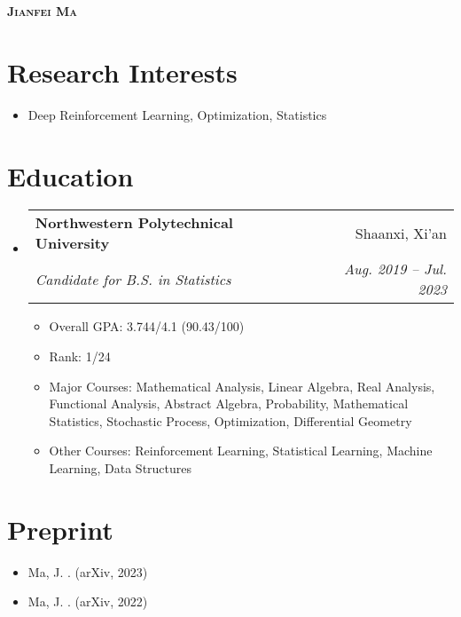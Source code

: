 \documentclass[letterpaper,11pt]{article}
\makeatletter
\newcommand{\resumeItem}[1]{
  \item\small{
    {#1 \vspace{-2pt}}
  }
}
\newcommand{\resumeSubheading}[4]{
  \vspace{-2pt}\item
    \begin{tabular*}{0.97\textwidth}[t]{l@{\extracolsep{\fill}}r}
      \textbf{#1} & #2 \\
      \textit{\small#3} & \textit{\small #4} \\
    \end{tabular*}\vspace{-7pt}
}
\newcommand{\resumeSubHeadingListStart}{\begin{itemize}[leftmargin=0.15in, label={}]}
\newcommand{\resumeSubHeadingListEnd}{\end{itemize}}
\newcommand{\resumeItemListStart}{\begin{itemize}}
\newcommand{\resumeItemListEnd}{\end{itemize}\vspace{-5pt}}
\makeatother
\begin{document}

\begin{center}
    \textbf{\Huge \scshape Jianfei Ma} \\ \vspace{1pt}
    \small{\item{
     {\href{mailto:matrixfeeney@gmail.com}{}}
    {\href{https://github.com/MagiFeeney}{}}     
     {\href{https://magifeeney.github.io}{}}       
    }}
\end{center}

\section{Research Interests}
  \resumeSubHeadingListStart
    \resumeItem
      {Deep Reinforcement Learning, Optimization, Statistics}%
  \resumeSubHeadingListEnd

\section{Education}
  \resumeSubHeadingListStart
    \resumeSubheading
      {Northwestern Polytechnical University}{Shaanxi, Xi'an}
      {Candidate for B.S. in Statistics}{Aug. 2019 -- Jul. 2023}
    \resumeItemListStart
      \resumeItem
      {Overall GPA: 3.744/4.1 (90.43/100)}
     \resumeItem
      {Rank: 1/24}
     \resumeItem
      {Major Courses: Mathematical Analysis, Linear Algebra, Real Analysis, Functional Analysis, Abstract Algebra, Probability, Mathematical Statistics, Stochastic Process, Optimization, Differential Geometry}
      \resumeItem
      {Other Courses: Reinforcement Learning, Statistical Learning, Machine Learning, Data Structures}
    \resumeItemListEnd
  \resumeSubHeadingListEnd

\section{Preprint}
      \resumeItemListStart
        \resumeItem{Ma, J. \href{https://arxiv.org/abs/2302.00533}{\color{darkblue}{Distillation Policy Optimization}}. (arXiv, 2023)}
        \resumeItem{Ma, J. \href{https://arxiv.org/abs/2208.09322v2}{\color{darkblue}{Entropy Augmented Reinforcement Learning}}. (arXiv, 2022)}
      \resumeItemListEnd
      
\end{document}
